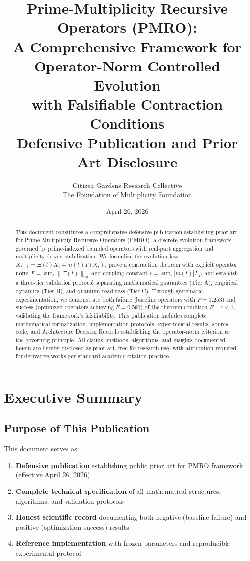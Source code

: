 \documentclass[11pt,a4paper]{article}
\title{%
  Prime-Multiplicity Recursive Operators (PMRO): \\
  A Comprehensive Framework for Operator-Norm Controlled Evolution \\
  with Falsifiable Contraction Conditions \\[1em]
  \large Defensive Publication and Prior Art Disclosure
}
\author{
Citizen Gardens Research Collective \\ The Foundation of Multiplicity Foundation
}
\date{April 26, 2026}
\begin{document}
\maketitle

\begin{abstract}
This document constitutes a comprehensive defensive publication establishing prior art for Prime-Multiplicity Recursive Operators (PMRO), a discrete evolution framework governed by prime-indexed bounded operators with real-part aggregation and multiplicity-driven stabilization. We formalize the evolution law \(X_{t+1} = \Xi(t)X_t + m(t)T(X_t)\), prove a contraction theorem with explicit operator norm \(F = \sup_t \|\Xi(t)\|_{\mathrm{op}}\) and coupling constant \(c = \sup_t |m(t)|L_T\), and establish a three-tier validation protocol separating mathematical guarantees (Tier A), empirical dynamics (Tier B), and quantum readiness (Tier C). Through systematic experimentation, we demonstrate both failure (baseline operators with \(F=1.253\)) and success (optimized operators achieving \(F=0.500\)) of the theorem condition \(F+c<1\), validating the framework's falsifiability. This publication includes complete mathematical formalization, implementation protocols, experimental results, source code, and Architecture Decision Records establishing the operator-norm criterion as the governing principle. All claims, methods, algorithms, and insights documented herein are hereby disclosed as prior art, free for research use, with attribution required for derivative works per standard academic citation practice.
\end{abstract}

\tableofcontents
\newpage

\section{Executive Summary}

\subsection{Purpose of This Publication}

This document serves as:
\begin{enumerate}
\item \textbf{Defensive publication} establishing public prior art for PMRO framework (effective April 26, 2026)
\item \textbf{Complete technical specification} of all mathematical structures, algorithms, and validation protocols
\item \textbf{Honest scientific record} documenting both negative (baseline failure) and positive (optimization success) results
\item \textbf{Reference implementation} with frozen parameters and reproducible experimental protocol
\end{enumerate}
\end{document}

